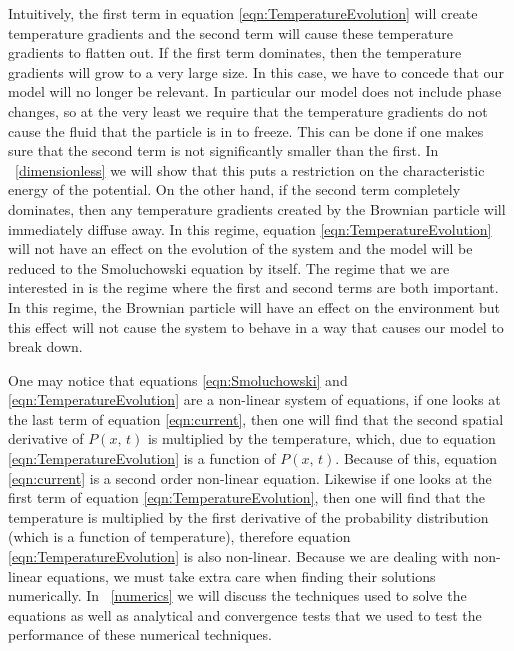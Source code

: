 Intuitively, the first term in equation \ref{eqn:TemperatureEvolution} will create temperature gradients and the second term will cause these temperature gradients to flatten out. If the first term dominates, then the temperature gradients will grow to a very large size. In this case, we have to concede that our model will no longer be relevant. In particular our model does not include phase changes, so at the very least we require that the temperature gradients do not cause the fluid that the particle is in to freeze. This can be done if one makes sure that the second term is not significantly smaller than the first. In ~\autoref{dimensionless} we will show that this puts a restriction on the characteristic energy of the potential. On the other hand, if the second term completely dominates, then any temperature gradients created by the Brownian particle will immediately diffuse away. In this regime, equation \ref{eqn:TemperatureEvolution} will not have an effect on the evolution of the system and the model will be reduced to the Smoluchowski equation by itself. The regime that we are interested in is the regime where the first and second terms are both important. In this regime, the Brownian particle will have an effect on the environment but this effect will not cause the system to behave in a way that causes our model to break down.

One may notice that equations \ref{eqn:Smoluchowski} and \ref{eqn:TemperatureEvolution} are a non-linear system of equations, if one looks at the last term of equation \ref{eqn:current}, then one will find that the second spatial derivative of $P(x, \, t)$ is multiplied by the temperature, which, due to equation \ref{eqn:TemperatureEvolution} is a function of $P(x, \, t)$. Because of this, equation \ref{eqn:current} is a second order non-linear equation. Likewise if one looks at the first term of equation \ref{eqn:TemperatureEvolution}, then one will find that the temperature is multiplied by the first derivative of the probability distribution (which is a function of temperature), therefore equation \ref{eqn:TemperatureEvolution} is also non-linear. Because we are dealing with non-linear equations, we must take extra care when finding their solutions numerically. In ~\autoref{numerics} we will discuss the techniques used to solve the equations as well as analytical and convergence tests that we used to test the performance of these numerical techniques.

